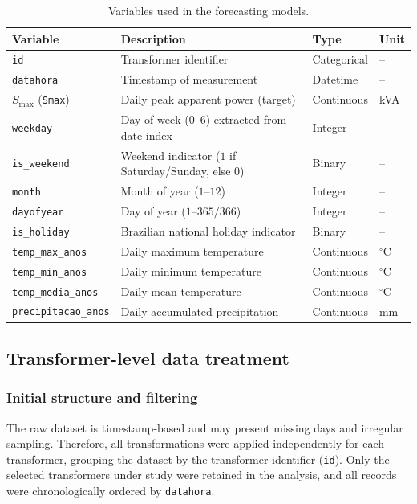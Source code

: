 \begin{table}[!t]
\centering
\caption{Variables used in the forecasting models.}
\label{tab:variables_used}
\footnotesize
\begin{tabular}{p{3.2cm} p{7.0cm} p{2.2cm} p{1.2cm}}
\toprule
\textbf{Variable} & \textbf{Description} & \textbf{Type} & \textbf{Unit} \\
\midrule
\texttt{id} & Transformer identifier & Categorical & -- \\
\texttt{datahora} & Timestamp of measurement & Datetime & -- \\
$S_{\max}$ (\texttt{Smax}) & Daily peak apparent power (target) & Continuous & kVA \\
\texttt{weekday} & Day of week ($0$--$6$) extracted from date index & Integer & -- \\
\texttt{is\_weekend} & Weekend indicator ($1$ if Saturday/Sunday, else $0$) & Binary & -- \\
\texttt{month} & Month of year ($1$--$12$) & Integer & -- \\
\texttt{dayofyear} & Day of year ($1$--$365/366$) & Integer & -- \\
\texttt{is\_holiday} & Brazilian national holiday indicator & Binary & -- \\
\texttt{temp\_max\_anos} & Daily maximum temperature & Continuous & $^\circ$C \\
\texttt{temp\_min\_anos} & Daily minimum temperature & Continuous & $^\circ$C \\
\texttt{temp\_media\_anos} & Daily mean temperature & Continuous & $^\circ$C \\
\texttt{precipitacao\_anos} & Daily accumulated precipitation & Continuous & mm \\
\bottomrule
\end{tabular}
\end{table}

\subsection{Transformer-level data treatment}
\label{subsec:data_treatment}

\subsubsection{Initial structure and filtering}
The raw dataset is timestamp-based and may present missing days and irregular sampling. Therefore, all transformations were applied independently for each transformer, grouping the dataset by the transformer identifier (\texttt{id}). Only the selected transformers under study were retained in the analysis, and all records were chronologically ordered by \texttt{datahora}.

